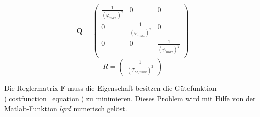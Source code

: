 \begin{equation}
\textbf{Q} = \begin{pmatrix}
\frac{1}{(\varphi_{max})^2} & 0 & 0 \\
0 & \frac{1}{(\dot{\varphi}_{max})^2} & 0 \\
0 & 0 & \frac{1}{(\dot{\psi}_{max})^2} \\
\end{pmatrix}
\end{equation}
\begin{equation}
R = \begin{pmatrix}
\frac{1}{(T_{M,max})^2}
\end{pmatrix}
\end{equation}

Die Reglermatrix $\textbf{F}$ muss die Eigenschaft besitzen die Gütefunktion (\ref{costfunction_equation}) zu minimieren. Dieses Problem wird mit Hilfe von der Matlab-Funktion \textit{lqrd} numerisch gelöst.